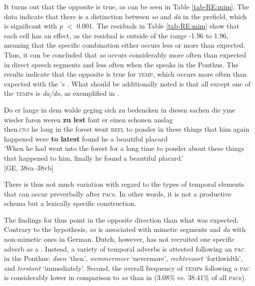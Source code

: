 \documentclass[output=paper,colorlinks,citecolor=brown]{langscibook}
\begin{document}
It turns out that the opposite is true, as can be seen in Table \ref{tab-RE:mim}. The data indicate that there is a distinction between \textit{so} and \textit{da} in the prefield, which is significant with \textit{p} $<$ 0.001. The residuals in Table \ref{tab-RE:mim} show that each cell has an effect, as the residual is outside of the range -1.96 to 1.96, meaning that the specific combination either occurs less or more than expected. Thus, it can be concluded that \textit{so} occurs considerably more often than expected in  direct speech segments and less often when the  speaks in the  Ponthus. The results indicate that the opposite is true for \textsc{temp}, which occurs more often than expected with the 's .
What should be additionally noted is that all except one of the \textsc{temp}s is \textit{da/do}, as exemplified in .

\ea \label{ex:zulest}
\gll Do er lange in dem walde geging sich zu bedencken in diesen sachen die yme wieder faren weren \textbf{zu lest} fant er einen schonen anslag\\
then.\textsc{cnj} he long in the forest went \textsc{refl} to ponder in these things that him again happened were \textbf{to latest} found he a beautiful placard\\
\glt `When he had went into the forest for a long time to ponder about these things that happened to him, finally he found a beautiful placard.'\\ \hfill [GE, 38va--38vb]
\z

\noindent There is thus not much variation with regard to the types of temporal elements that can occur preverbally after \textsc{pac}s. In other words, it is not a productive schema but a lexically specific construction.

The findings for  thus point in the opposite direction than what was expected: Contrary to the hypothesis, \textit{so} is associated with mimetic segments and \textit{da} with non-mimetic ones in German. Dutch, however, has not recruited one specific adverb as a . Instead, a variety of temporal adverbs is attested following an \textsc{pac} in the  Ponthus: \textit{doen} `then', \textit{nemmermeer} `nevermore', \textit{rechtevoort} `forthwidth', and \textit{terstont} `immediately'. Second, the overall frequency of \textsc{temp}s following a \textsc{pac} is considerably lower in comparison to \textit{so} than in  (3.08\% vs. 38.41\% of all \textsc{pac}s).
\end{document}
